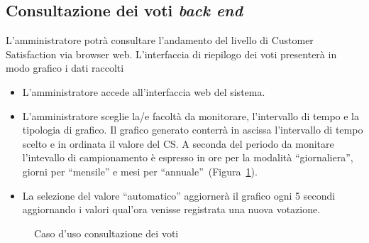 \subsection{Consultazione dei voti \emph{back end}}
L'amministratore potrà consultare l'andamento del livello di Customer
Satisfaction via browser web. L’interfaccia di riepilogo dei
voti presenterà in modo graﬁco i dati raccolti
\begin{itemize}
  \item L'amministratore accede all'interfaccia web del sistema.
  \item L'amministratore sceglie la/e facoltà da monitorare, l'intervallo di
  tempo e la tipologia di grafico. Il grafico generato conterrà in ascissa
  l'intervallo di tempo scelto e in ordinata il valore del CS. A seconda
  del periodo da monitare l'intevallo di campionamento è espresso in ore per la
  modalità ``giornaliera'', giorni per ``mensile'' e mesi per
  ``annuale''~(Figura~\ref{fig::usecase-monitoring}).
  \item La selezione del valore ``automatico'' aggiornerà il grafico ogni 5
  secondi aggiornando i valori qual'ora venisse registrata una nuova votazione.
\end{itemize}

\begin{figure}[!h]
  \centering
  \caption{Caso d'uso consultazione dei voti}
  \label{fig::usecase-monitoring}
\end{figure}
